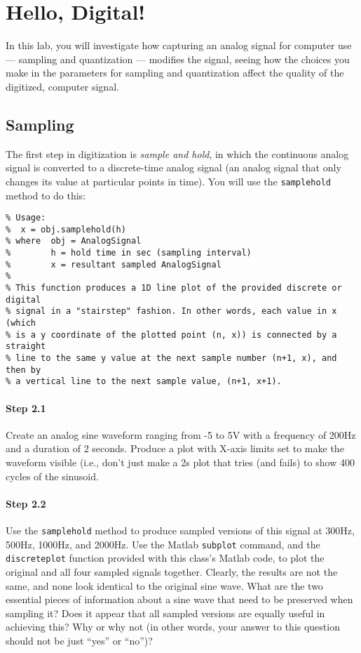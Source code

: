 
\section{Hello, Digital!}

In this lab, you will investigate how capturing an analog signal for
computer use --- sampling and quantization --- modifies the signal,
seeing how the choices you make in the parameters for sampling and
quantization affect the quality of the digitized, computer signal.

\subsection{Sampling}

The first step in digitization is \emph{sample and hold}, in which the
continuous analog signal is converted to a discrete-time analog signal
(an analog signal that only changes its value at particular points in
time). You will use the \texttt{samplehold} method to do this:
\begin{lstlisting}[style=Matlab-editor,basicstyle=\mlttfamily\small]
% samplehold Perform a sample and hold function on an AnalogSignal
% Usage:
%  x = obj.samplehold(h)
% where  obj = AnalogSignal
%        h = hold time in sec (sampling interval)
%        x = resultant sampled AnalogSignal
%
% This function produces a 1D line plot of the provided discrete or digital
% signal in a "stairstep" fashion. In other words, each value in x (which
% is a y coordinate of the plotted point (n, x)) is connected by a straight
% line to the same y value at the next sample number (n+1, x), and then by
% a vertical line to the next sample value, (n+1, x+1).
\end{lstlisting}

\paragraph{Step 2.1} Create an analog sine waveform ranging from -5 to
5V with a frequency of 200Hz and a duration of 2 seconds. Produce a
plot with X-axis limits set to make the waveform visible (i.e., don't
just make a 2s plot that tries (and fails) to show 400 cycles of the
sinusoid.

\paragraph{Step 2.2} Use the \texttt{samplehold} method to produce
sampled versions of this signal at 300Hz, 500Hz, 1000Hz, and
2000Hz. Use the Matlab \texttt{subplot} command, and the
\texttt{discreteplot} function provided with this class's Matlab code,
to plot the original and all four sampled signals together. Clearly,
the results are not the same, and none look identical to the original
sine wave. What are the two essential pieces of information about a
sine wave that need to be preserved when sampling it? Does it appear
that all sampled versions are equally useful in achieving this? Why or
why not (in other words, your answer to this question should not be
just ``yes'' or ``no'')?

